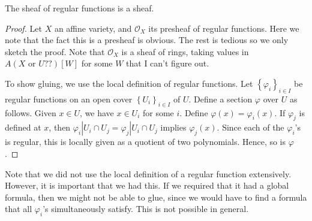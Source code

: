 \begin{proposition}\label{prp:sheaf-is-sheaf}
	The sheaf of regular functions is a sheaf.
\end{proposition}
\begin{proof}
	Let $X$ an affine variety, and $\mathcal{O}_{X} $ its presheaf of regular functions. Here we note that the fact this is a presheaf is obvious. The rest is tedious so we only sketch the proof. Note that $\mathcal{O}_{X} $ is a sheaf of rings, taking values in $A(X\text{ or $U$??})[W]$ for some $W$ that I can't figure out.

	To show gluing, we use the local definition of regular functions. Let $\left\{ \varphi _i \right\} _{i\in I} $ be regular functions on an open cover $\left\{ U_i \right\} _{i\in I} $ of $U$. Define a section $\varphi $ over $U$ as follows. Given $x\in U$, we have $x\in U_i$ for some $i$. Define $\varphi (x) = \varphi _i(x)$. If $\varphi _j$ is defined at $x$, then $\varphi _i|U_i \cap U_j = \varphi _j|U_i \cap U_j$ implies $\varphi _j(x)$. Since each of the $\varphi _i$'s is regular, this is locally given as a quotient of two polynomials. Hence, so is $\varphi $.
\end{proof}
\begin{remark}
	Note that we did not use the local definition of a regular function extensively. However, it is important that we had this. If we required that it had a global formula, then we might not be able to glue, since we would have to find a formula that all $\varphi _i$'s simultaneously satisfy. This is not possible in general.
\end{remark}

